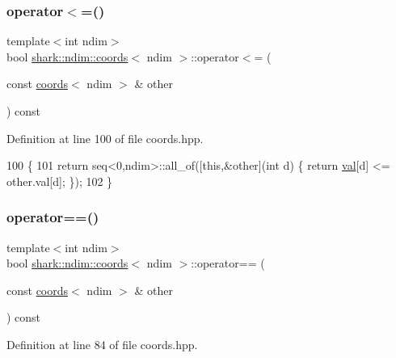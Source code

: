 \subsubsection{\texorpdfstring{operator$<$=()}{operator<=()}}
{\footnotesize\ttfamily template$<$int ndim$>$ \\
bool \hyperlink{structshark_1_1ndim_1_1coords}{shark\+::ndim\+::coords}$<$ ndim $>$\+::operator$<$= (\begin{DoxyParamCaption}\item[{const \hyperlink{structshark_1_1ndim_1_1coords}{coords}$<$ ndim $>$ \&}]{other }\end{DoxyParamCaption}) const\hspace{0.3cm}{\ttfamily [inline]}}



Definition at line 100 of file coords.\+hpp.


\begin{DoxyCode}
100                                                                             \{
101             \textcolor{keywordflow}{return} seq<0,ndim>::all\_of([\textcolor{keyword}{this},&other](\textcolor{keywordtype}{int} d) \{ \textcolor{keywordflow}{return} \hyperlink{structshark_1_1ndim_1_1coords_a425262af388367b0f0079218e038aef5}{val}[d] <= other.val[d]; \});
102         \}
\end{DoxyCode}
\hypertarget{structshark_1_1ndim_1_1coords_a32fe0dc972d14e7b8bc9c0581faa3708}{}\label{structshark_1_1ndim_1_1coords_a32fe0dc972d14e7b8bc9c0581faa3708} 
\subsubsection{\texorpdfstring{operator==()}{operator==()}}
{\footnotesize\ttfamily template$<$int ndim$>$ \\
bool \hyperlink{structshark_1_1ndim_1_1coords}{shark\+::ndim\+::coords}$<$ ndim $>$\+::operator== (\begin{DoxyParamCaption}\item[{const \hyperlink{structshark_1_1ndim_1_1coords}{coords}$<$ ndim $>$ \&}]{other }\end{DoxyParamCaption}) const\hspace{0.3cm}{\ttfamily [inline]}}



Definition at line 84 of file coords.\+hpp.


